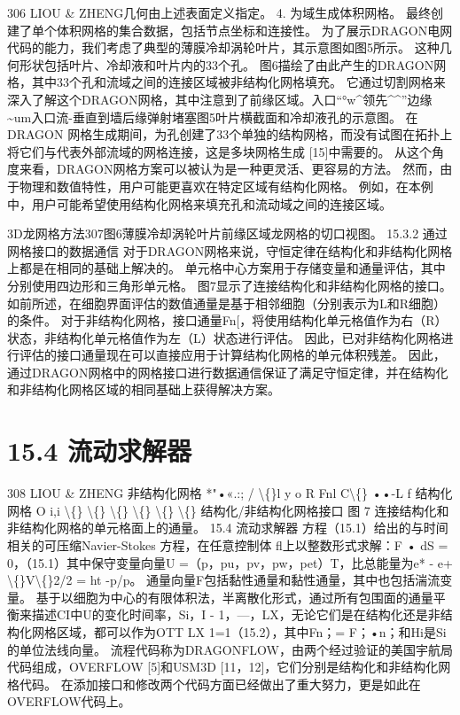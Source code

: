 \documentclass[UTF8,11pt,a4paper,openany,fontset=fandol]{ctexbook}
\begin{document}
306 LIOU \& ZHENG几何由上述表面定义指定。 4. 为域生成体积网格。 最终创建了单个体积网格的集合数据，包括节点坐标和连接性。 为了展示DRAGON电网代码的能力，我们考虑了典型的薄膜冷却涡轮叶片，其示意图如图5所示。 这种几何形状包括叶片、冷却液和叶片内的33个孔。 图6描绘了由此产生的DRAGON网格，其中33个孔和流域之间的连接区域被非结构化网格填充。 它通过切割网格来深入了解这个DRAGON网格，其中注意到了前缘区域。入口“°w\textasciicircum{}领先\textasciicircum{}\textasciicircum{}”边缘\textasciitilde{}um入口流-垂直到墙后缘弹射堵塞图5叶片横截面和冷却液孔的示意图。 在DRAGON 网格生成期间，为孔创建了33个单独的结构网格，而没有试图在拓扑上将它们与代表外部流域的网格连接，这是多块网格生成 [15]中需要的。 从这个角度来看，DRAGON网格方案可以被认为是一种更灵活、更容易的方法。 然而，由于物理和数值特性，用户可能更喜欢在特定区域有结构化网格。 例如，在本例中，用户可能希望使用结构化网格来填充孔和流动域之间的连接区域。

3D龙网格方法307图6薄膜冷却涡轮叶片前缘区域龙网格的切口视图。 15.3.2 通过网格接口的数据通信 对于DRAGON网格来说，守恒定律在结构化和非结构化网格上都是在相同的基础上解决的。 单元格中心方案用于存储变量和通量评估，其中分别使用四边形和三角形单元格。 图7显示了连接结构化和非结构化网格的接口。 如前所述，在细胞界面评估的数值通量是基于相邻细胞（分别表示为L和R细胞）的条件。 对于非结构化网格，接口通量Fn[，将使用结构化单元格值作为右（R）状态，非结构化单元格值作为左（L）状态进行评估。 因此，已对非结构化网格进行评估的接口通量现在可以直接应用于计算结构化网格的单元体积残差。 因此，通过DRAGON网格中的网格接口进行数据通信保证了满足守恒定律，并在结构化和非结构化网格区域的相同基础上获得解决方案。

\section{15.4 流动求解器}
308 LIOU \& ZHENG 非结构化网格 *"•«.:; / \textbackslash\{\}l y o R Fnl C\textbackslash\{\} ••-L f 结构化网格 O i,i \textbackslash\{\} \textbackslash\{\} \textbackslash\{\} \textbackslash\{\} \textbackslash\{\} \textbackslash\{\} 结构化/非结构化网格接口 图 7 连接结构化和非结构化网格的单元格面上的通量。 15.4 流动求解器 方程（15.1）给出的与时间相关的可压缩Navier-Stokes 方程，在任意控制体 fl上以整数形式求解：F • dS = 0，（15.1）其中保守变量向量U =（p，pu，pv，pw，pet）T，比总能量为e* - e+ \textbackslash\{\}V\textbackslash\{\}2/2 = ht -p/p。 通量向量F包括黏性通量和黏性通量，其中也包括湍流变量。 基于以细胞为中心的有限体积法，半离散化形式，通过所有包围面的通量平衡来描述CI中U的变化时间率，Si，I - 1，---，LX，无论它们是在结构化还是非结构化网格区域，都可以作为OTT LX 1=1（15.2），其中Fn；= F；•n；和Hi是Si的单位法线向量。 流程代码称为DRAGONFLOW，由两个经过验证的美国宇航局代码组成，OVERFLOW [5]和USM3D [11，12]，它们分别是结构化和非结构化网格代码。 在添加接口和修改两个代码方面已经做出了重大努力，更是如此在OVERFLOW代码上。
\end{document}
